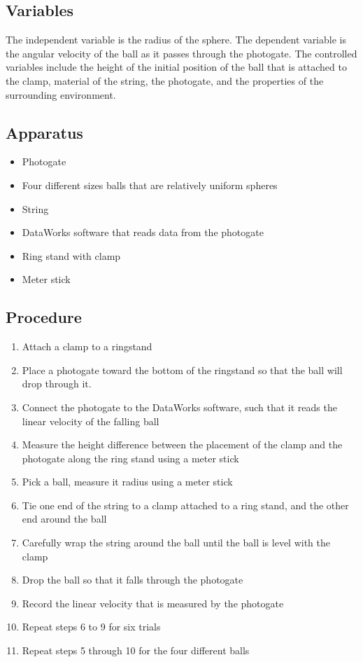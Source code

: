 \documentclass[10pt, letterpaper]{article}
\begin{document}
    \subsection{Variables}
    The independent variable is the radius of the sphere. The dependent variable is the
    angular velocity of the ball as it passes through the photogate. The controlled variables
    include the height of the initial position of the ball that is attached to the clamp,
    material of the string, the photogate, and the properties of the surrounding environment.

    \subsection{Apparatus}
    \begin{itemize}
      \item Photogate
      \item Four different sizes balls that are relatively uniform spheres
      \item String
      \item DataWorks software that reads data from the photogate
      \item Ring stand with clamp
      \item Meter stick
    \end{itemize}

    \subsection{Procedure}
    \begin{enumerate}
      \item Attach a clamp to a ringstand
      \item Place a photogate toward the bottom of the ringstand so that the ball will drop through it.
      \item Connect the photogate to the DataWorks software, such that it reads the linear velocity of the falling ball
      \item Measure the height difference between the placement of the clamp and the photogate along the ring stand using a meter stick
      \item Pick a ball, measure it radius using a meter stick
      \item Tie one end of the string to a clamp attached to a ring stand, and the other end around the ball
      \item Carefully wrap the string around the ball until the ball is level with the clamp
      \item Drop the ball so that it falls through the photogate
      \item Record the linear velocity that is measured by the photogate
      \item Repeat steps 6 to 9 for six trials
      \item Repeat steps 5 through 10 for the four different balls
    \end{enumerate}
\end{document}
